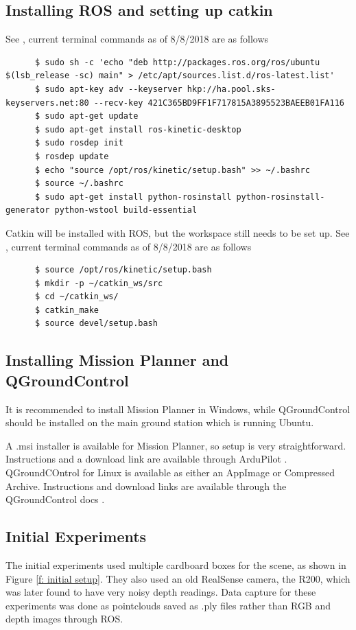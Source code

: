 \documentclass[12pt,a4paper]{article}
\begin{document}
  \subsection{Installing ROS and setting up catkin} 
    \label{a: install ROS and catkin}
      See \cite{ros}, current terminal commands as of 8/8/2018 are as follows
      \begin{verbatim}
      $ sudo sh -c 'echo "deb http://packages.ros.org/ros/ubuntu $(lsb_release -sc) main" > /etc/apt/sources.list.d/ros-latest.list'
      $ sudo apt-key adv --keyserver hkp://ha.pool.sks-keyservers.net:80 --recv-key 421C365BD9FF1F717815A3895523BAEEB01FA116
      $ sudo apt-get update
      $ sudo apt-get install ros-kinetic-desktop
      $ sudo rosdep init
      $ rosdep update
      $ echo "source /opt/ros/kinetic/setup.bash" >> ~/.bashrc
      $ source ~/.bashrc
      $ sudo apt-get install python-rosinstall python-rosinstall-generator python-wstool build-essential
      \end{verbatim}
      Catkin will be installed with ROS, but the workspace still needs to be set up. See \cite{catkin}, current terminal commands as of 8/8/2018 are as follows
      \begin{verbatim}
      $ source /opt/ros/kinetic/setup.bash
      $ mkdir -p ~/catkin_ws/src
      $ cd ~/catkin_ws/
      $ catkin_make
      $ source devel/setup.bash
      \end{verbatim}

    \subsection{Installing Mission Planner and QGroundControl} 
      \label{a: install MP QGC}
      It is recommended to install Mission Planner in Windows, while QGroundControl should be installed on the main ground station which is running Ubuntu.
       
      A .msi installer is available for Mission Planner, so setup is very straightforward. Instructions and a download link are available through ArduPilot \cite{mission-planner}. QGroundCOntrol for Linux is available as either an AppImage or Compressed Archive. Instructions and download links are available through the QGroundControl docs \cite{Qgt}.

  \subsection{Initial Experiments}
    \label{a: exp initial}
    The initial experiments used multiple cardboard boxes for the scene, as shown in Figure \ref{f: initial setup}. They also used an old RealSense camera, the R200, which was later found to have very noisy depth readings. Data capture for these experiments was done as pointclouds saved as .ply files rather than RGB and depth images through ROS.
     
\end{document}
